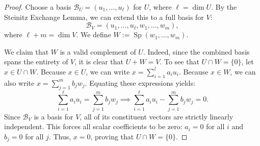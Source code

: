 \begin{proof}
Choose a basis $\mathcal{B}_U = (u_1, \dots, u_{\ell})$ for $U$, where $\ell = \dim U$. By the Steinitz Exchange Lemma, we can extend this to a full basis for $V$:
\[
\mathcal{B}_V = (u_1, \dots, u_{\ell}, w_1, \dots, w_m),
\]
where $\ell + m = \dim V$. We define $W := \operatorname{Sp}(w_1, \dots, w_m)$. 

We claim that $W$ is a valid complement of $U$. Indeed, since the combined basis spans the entirety of $V$, it is clear that $U + W = V$. To see that $U \cap W = \{0\}$, let $x \in U \cap W$. Because $x \in U$, we can write $x = \sum_{i=1}^l a_i u_i$. Because $x \in W$, we can also write $x = \sum_{j=1}^m b_j w_j$. Equating these expressions yields:
\[
\sum_{i=1}^{\ell} a_i u_i = \sum_{j=1}^m b_j w_j \implies \sum_{i=1}^{\ell} a_i u_i - \sum_{j=1}^m b_j w_j = 0.
\]
Since $\mathcal{B}_V$ is a basis for $V$, all of its constituent vectors are strictly linearly independent. This forces all scalar coefficients to be zero: $a_i = 0$ for all $i$ and $b_j = 0$ for all $j$. Thus, $x = 0$, proving that $U \cap W = \{0\}$.
\end{proof}